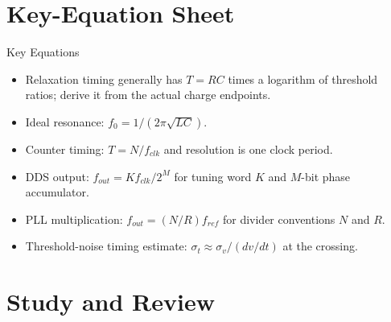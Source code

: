\documentclass[10pt,letterpaper]{article}
\begin{document}
\section{Key-Equation Sheet}
\begin{CornellExamBox}{Key Equations}
\begin{itemize}
  \item Relaxation timing generally has $T=RC$ times a logarithm of threshold ratios; derive it from the actual charge endpoints.
  \item Ideal resonance: $f_0=1/(2\pi\sqrt{LC})$.
  \item Counter timing: $T=N/f_{clk}$ and resolution is one clock period.
  \item DDS output: $f_{out}=Kf_{clk}/2^M$ for tuning word $K$ and $M$-bit phase accumulator.
  \item PLL multiplication: $f_{out}=(N/R)f_{ref}$ for divider conventions $N$ and $R$.
  \item Threshold-noise timing estimate: $\sigma_t\approx\sigma_v/(dv/dt)$ at the crossing.
\end{itemize}\end{CornellExamBox}
\section{Study and Review}
\end{document}
